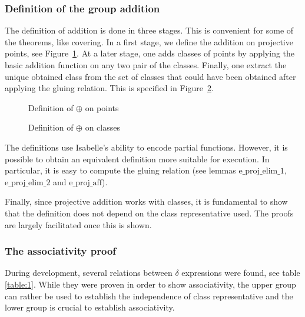 \documentclass{llncs}
\begin{document}
\subsubsection{Definition of the group addition}

The definition of addition is done in three stages. This is convenient
for some of the theorems, like covering. In a first stage, we define
the addition on projective points, see Figure~\ref{fig3}. At a later
stage, one adds classes of points by applying the basic addition
function on any two pair of the classes. Finally, one extract the
unique obtained class from the set of classes that could have been
obtained after applying the gluing relation. This is specified in
Figure~\ref{fig4}.

\begin{figure}
{}
\caption{Definition of $\oplus$ on points}
\label{fig3}
\end{figure}
\begin{figure}
	{}
	{}
	\caption{Definition of $\oplus$ on classes}
	\label{fig4}
\end{figure}

The definitions use Isabelle's ability to encode partial
functions. However, it is possible to obtain an equivalent definition
more suitable for execution. In particular, it is easy to compute the
gluing relation (see lemmas $\text{e\_proj\_elim\_1}$,
$\text{e\_proj\_elim\_2}$ and $\text{e\_proj\_aff}$).

Finally, since projective addition works with classes, it is
fundamental to show that the definition does not depend on the class
representative used. The proofs are largely facilitated once this is
shown.

\subsubsection{The associativity proof}

During development, several relations between $\delta$ expressions
were found, see table \ref{table:1}. While they were proven in order
to show associativity, the upper group can rather be used to establish
the independence of class representative and the lower group is
crucial to establish associativity.
\end{document}
